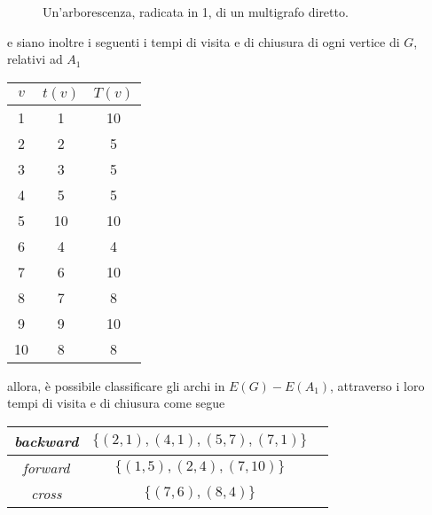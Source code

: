\documentclass[a4paper, 12pt]{report}
\begin{document}
\begin{example}
\begin{figure}[H]
            \caption{Un'arborescenza, radicata in 1, di un multigrafo diretto.}
        \end{figure}

        e siano inoltre i seguenti i tempi di visita e di chiusura di ogni vertice di $G$, relativi ad $A_1$

        \begin{center}
            \begin{tabular}{c|c c} 
                 \hline
                 $v$ & $t(v)$ & $T(v)$ \\
                 \hline\hline
                 1 & 1 & 10 \\ 
                 \hline
                 2 & 2 & 5 \\
                 \hline
                 3 & 3 & 5 \\
                 \hline
                 4 & 5 & 5 \\
                 \hline
                 5 & 10 & 10 \\
                 \hline
                 6 & 4 & 4 \\
                 \hline
                 7 & 6 & 10 \\
                 \hline
                 8 & 7 & 8 \\
                 \hline
                 9 & 9 & 10 \\
                 \hline
                 10 & 8 & 8 \\
                 \hline
            \end{tabular}
        \end{center}

        allora, è possibile classificare gli archi in $E(G) - E(A_1)$, attraverso i loro tempi di visita e di chiusura come segue 

        \begin{center}
            \begin{tabular}{c||c c} 
                 \hline
                 \textit{backward} & $\{(2, 1), (4, 1), (5, 7), (7, 1)\}$ \\
                 \hline
                 \textit{forward} & $\{(1, 5), (2, 4), (7, 10)\}$\\ 
                 \hline
                 \textit{cross} & $\{(7, 6), (8, 4)\}$\\
                 \hline
            \end{tabular}
        \end{center}
    \end{example}
\end{document}

